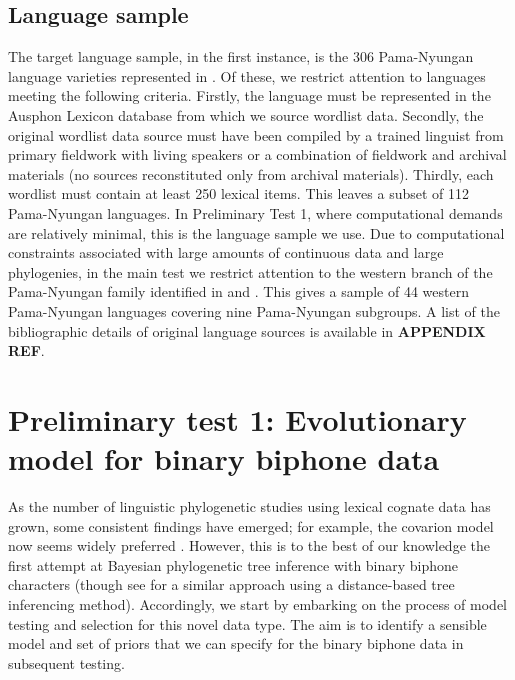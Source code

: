 \hypertarget{language-sample}{%
\subsection{Language sample}\label{language-sample}}

The target language sample, in the first instance, is the 306 Pama-Nyungan language varieties represented in \textcite{bouckaert_origin_2018}. Of these, we restrict attention to languages meeting the following criteria. Firstly, the language must be represented in the Ausphon Lexicon database \autocite{round_ausphon-lexicon_2017} from which we source wordlist data. Secondly, the original wordlist data source must have been compiled by a trained linguist from primary fieldwork with living speakers or a combination of fieldwork and archival materials (no sources reconstituted only from archival materials). Thirdly, each wordlist must contain at least 250 lexical items. This leaves a subset of 112 Pama-Nyungan languages. In Preliminary Test 1, where computational demands are relatively minimal, this is the language sample we use. Due to computational constraints associated with large amounts of continuous data and large phylogenies, in the main test we restrict attention to the western branch of the Pama-Nyungan family identified in \textcite{bowern_computational_2012} and \textcite{bouckaert_origin_2018}. This gives a sample of 44 western Pama-Nyungan languages covering nine Pama-Nyungan subgroups. A list of the bibliographic details of original language sources is available in \textbf{APPENDIX REF}.

\hypertarget{prelim-1}{%
\section{Preliminary test 1: Evolutionary model for binary biphone data}\label{prelim-1}}

As the number of linguistic phylogenetic studies using lexical cognate data has grown, some consistent findings have emerged; for example, the covarion model now seems widely preferred \autocites[e.g.][]{bouckaert_origin_2018}{kolipakam_bayesian_2018}{savelyev_bayesian_2020}. However, this is to the best of our knowledge the first attempt at Bayesian phylogenetic tree inference with binary biphone characters (though see \textcite{jager_inferring_2016} for a similar approach using a distance-based tree inferencing method). Accordingly, we start by embarking on the process of model testing and selection for this novel data type. The aim is to identify a sensible model and set of priors that we can specify for the binary biphone data in subsequent testing.


